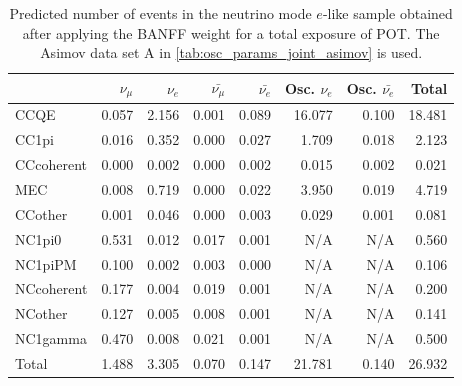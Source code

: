 
\begin{table}
\center
\begin{tabular} { | l ||r | r | r | r | r | r | | r | }
\hline
              & $\nu_\mu$            & $\nu_e$              & $\bar{\nu_\mu}$      & $\bar{\nu_e}$        & Osc. $\nu_e$         & Osc. $\bar{\nu_e}$   & Total                \\ \hline\hline
 CCQE         & 0.057                & 2.156                & 0.001                & 0.089                & 16.077               & 0.100                & 18.481               \\ \hline
 CC1pi        & 0.016                & 0.352                & 0.000                & 0.027                & 1.709                & 0.018                & 2.123                \\ \hline
 CCcoherent   & 0.000                & 0.002                & 0.000                & 0.002                & 0.015                & 0.002                & 0.021                \\ \hline
 MEC          & 0.008                & 0.719                & 0.000                & 0.022                & 3.950                & 0.019                & 4.719                \\ \hline
 CCother      & 0.001                & 0.046                & 0.000                & 0.003                & 0.029                & 0.001                & 0.081                \\ \hline
 NC1pi0       & 0.531                & 0.012                & 0.017                & 0.001                & N/A                  & N/A                  & 0.560                \\ \hline
 NC1piPM      & 0.100                & 0.002                & 0.003                & 0.000                & N/A                  & N/A                  & 0.106                \\ \hline
 NCcoherent   & 0.177                & 0.004                & 0.019                & 0.001                & N/A                  & N/A                  & 0.200                \\ \hline
 NCother      & 0.127                & 0.005                & 0.008                & 0.001                & N/A                  & N/A                  & 0.141                \\ \hline
 NC1gamma     & 0.470                & 0.008                & 0.021                & 0.001                & N/A                  & N/A                  & 0.500                \\ \hline
\hline
 Total        & 1.488                & 3.305                & 0.070                & 0.147                & 21.781               & 0.140                & 26.932               \\ \hline

\end{tabular}
\caption{
Predicted number of events in the neutrino mode $e$-like sample
obtained after applying the BANFF weight
for a total exposure of \TotalPotNuRunOneSevenB{} POT.
The Asimov data set A in \cref{tab:osc_params_joint_asimov} is used.
}
\label{tab:events_1re_Asimov_A_Run17b}
\end{table}


